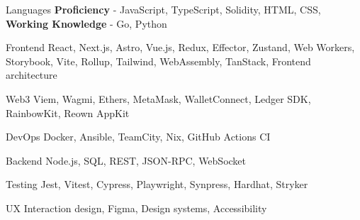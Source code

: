 

\begin{cvskills}

  \cvskill
    {Languages} %
    {\textbf{Proficiency} - JavaScript, TypeScript, Solidity, HTML, CSS, \textbf{Working Knowledge} - Go, Python} %

  \cvskill
    {Frontend} %
    {React, Next.js, Astro, Vue.js, Redux, Effector, Zustand, Web Workers, Storybook, Vite, Rollup, Tailwind, WebAssembly, TanStack, Frontend architecture} %

  \cvskill
    {Web3} %
    {Viem, Wagmi, Ethers, MetaMask, WalletConnect, Ledger SDK, RainbowKit, Reown AppKit} %

  \cvskill
    {DevOps} %
    {Docker, Ansible, TeamCity, Nix, GitHub Actions CI} %

  \cvskill
    {Backend} %
    {Node.js, SQL, REST, JSON-RPC, WebSocket} %

  \cvskill
    {Testing} %
    {Jest, Vitest, Cypress, Playwright, Synpress, Hardhat, Stryker} %

  \cvskill
    {UX} %
    {Interaction design, Figma, Design systems, Accessibility} %

\end{cvskills}
